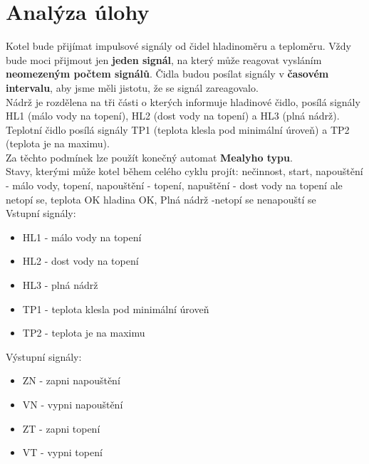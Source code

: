 \documentclass[12pt]{report}
\begin{document}
\chapter{Analýza úlohy}
Kotel bude přijímat impulsové signály od čidel hladinoměru a teploměru. Vždy bude moci přijmout jen \textbf{jeden signál}, na který může reagovat vysláním \textbf{neomezeným počtem signálů}.
Čidla budou posílat signály v \textbf{časovém intervalu}, aby jsme měli jistotu, že se signál zareagovalo.\\
Nádrž je rozdělena na tři části o kterých informuje hladinové čidlo, posílá signály HL1 (málo vody na topení), HL2 (dost vody na topení) a HL3 (plná nádrž).
Teplotní čidlo posílá signály TP1 (teplota klesla pod minimální úroveň) a TP2 (teplota je na maximu).\\
Za těchto podmínek lze použít konečný automat \textbf{Mealyho typu}.\\
Stavy, kterými může kotel během celého cyklu projít: nečinnost, start, napouštění - málo vody, topení, napouštění - topení, napuštění - dost vody na topení ale netopí se, teplota OK hladina OK, Plná nádrž -netopí se nenapouští se\\

Vstupní signály: 
\begin{itemize}
\item HL1 - málo vody na topení
\item HL2 - dost vody na topení
\item HL3 - plná nádrž
\item TP1 - teplota klesla pod minimální úroveň
\item TP2 - teplota je na maximu
\end{itemize}

Výstupní signály: 
\begin{itemize}
\item ZN - zapni napouštění
\item VN - vypni napouštění
\item ZT - zapni topení
\item VT - vypni topení
\end{itemize}
\end{document}
